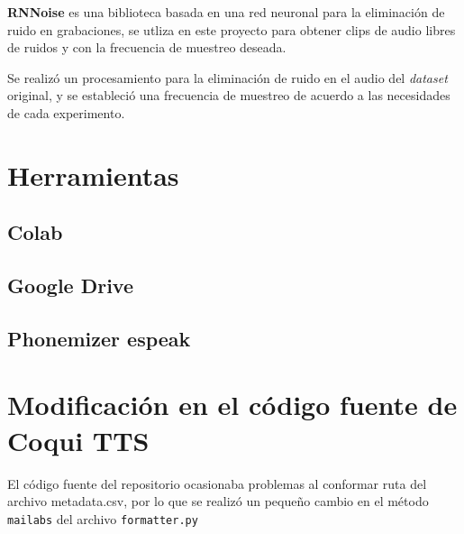 \textbf{RNNoise} es una biblioteca basada en una red neuronal para la eliminación de ruido en grabaciones, se utliza en este proyecto para obtener clips de audio libres de ruidos y con la frecuencia de muestreo deseada.

Se realizó un procesamiento para la eliminación de ruido en el audio del \textit{dataset} original, y se estableció una frecuencia de muestreo de acuerdo a las necesidades de cada experimento. 

\section{Herramientas}
\subsection{Colab}
\subsection{Google Drive}
\subsection{Phonemizer espeak}

\section{Modificación en el código fuente de Coqui TTS}
El código fuente del repositorio ocasionaba problemas al conformar ruta del archivo metadata.csv, por lo que se realizó un pequeño cambio en el método \texttt{mailabs} del archivo \texttt{formatter.py}


